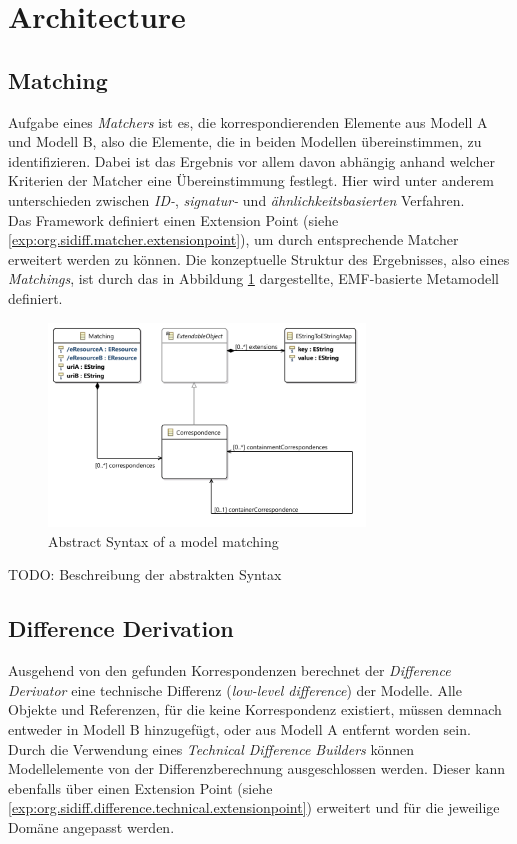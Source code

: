 \section{Architecture}

\subsection{Matching}

Aufgabe eines \textit{Matchers} ist es, die korrespondierenden Elemente aus Modell A und Modell B, also die Elemente, die in beiden Modellen übereinstimmen, zu identifizieren.
Dabei ist das Ergebnis vor allem davon abhängig anhand welcher Kriterien der Matcher eine Übereinstimmung festlegt.
Hier wird unter anderem unterschieden zwischen \textit{ID-}, \textit{signatur-} und \textit{ähnlichkeitsbasierten} Verfahren.\\
Das Framework definiert einen Extension Point (siehe \ref{exp:org.sidiff.matcher.extensionpoint}), um durch entsprechende Matcher erweitert werden zu können.
Die konzeptuelle Struktur des Ergebnisses, also eines \textit{Matchings}, ist durch das in Abbildung \ref{fig:matching_model} dargestellte, EMF-basierte Metamodell definiert.

\begin{figure}[h!]
\centering
\includegraphics[width=0.75\textwidth]{images/architecture/matching_model}
\caption{Abstract Syntax of a model matching}
\label{fig:matching_model}
\end{figure}

TODO: Beschreibung der abstrakten Syntax

\newpage


\subsection{Difference Derivation}
Ausgehend von den gefunden Korrespondenzen berechnet der \textit{Difference Derivator} eine technische Differenz (\textit{low-level difference}) der Mo\-del\-le.
Alle Objekte und Referenzen, für die keine Korrespondenz existiert, müssen demnach entweder in Modell B hinzugefügt, oder aus Modell A entfernt worden sein. 
Durch die Verwendung eines \textit{Technical Difference Builders} können Modellelemente von der Differenzberechnung ausgeschlossen werden.
Dieser kann ebenfalls über einen Extension Point (siehe \ref{exp:org.sidiff.difference.technical.extensionpoint}) erweitert und für die jeweilige Domäne angepasst werden.
\newpage


